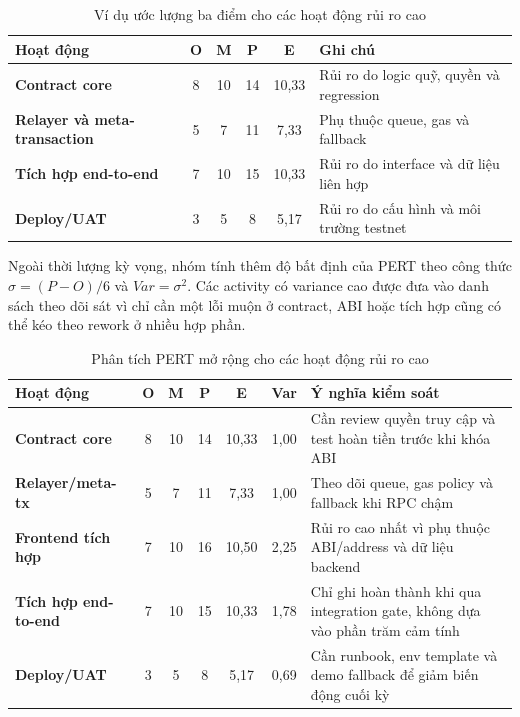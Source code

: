 \begin{table}[H]
\centering
\caption{Ví dụ ước lượng ba điểm cho các hoạt động rủi ro cao}
\label{tab:three-point-estimation}
\begin{tabularx}{\textwidth}{| >{\bfseries}p{4.2cm} | c | c | c | c | X |}
\hline
Hoạt động & O & M & P & E & Ghi chú \\
\hline
Contract core & 8 & 10 & 14 & 10,33 & Rủi ro do logic quỹ, quyền và regression \\ \hline
Relayer và meta-transaction & 5 & 7 & 11 & 7,33 & Phụ thuộc queue, gas và fallback \\ \hline
Tích hợp end-to-end & 7 & 10 & 15 & 10,33 & Rủi ro do interface và dữ liệu liên hợp \\ \hline
Deploy/UAT & 3 & 5 & 8 & 5,17 & Rủi ro do cấu hình và môi trường testnet \\
\hline
\end{tabularx}
\end{table}

Ngoài thời lượng kỳ vọng, nhóm tính thêm độ bất định của PERT theo công thức $\sigma=(P-O)/6$ và $Var=\sigma^2$. Các activity có variance cao được đưa vào danh sách theo dõi sát vì chỉ cần một lỗi muộn ở contract, ABI hoặc tích hợp cũng có thể kéo theo rework ở nhiều hợp phần.

\begin{table}[H]
\centering
\caption{Phân tích PERT mở rộng cho các hoạt động rủi ro cao}
\label{tab:pert-variance}
\begin{tabularx}{\textwidth}{| >{\bfseries}p{3.2cm} | c | c | c | c | c | X |}
\hline
Hoạt động & O & M & P & E & Var & Ý nghĩa kiểm soát \\
\hline
Contract core & 8 & 10 & 14 & 10,33 & 1,00 & Cần review quyền truy cập và test hoàn tiền trước khi khóa ABI \\ \hline
Relayer/meta-tx & 5 & 7 & 11 & 7,33 & 1,00 & Theo dõi queue, gas policy và fallback khi RPC chậm \\ \hline
Frontend tích hợp & 7 & 10 & 16 & 10,50 & 2,25 & Rủi ro cao nhất vì phụ thuộc ABI/address và dữ liệu backend \\ \hline
Tích hợp end-to-end & 7 & 10 & 15 & 10,33 & 1,78 & Chỉ ghi hoàn thành khi qua integration gate, không dựa vào phần trăm cảm tính \\ \hline
Deploy/UAT & 3 & 5 & 8 & 5,17 & 0,69 & Cần runbook, env template và demo fallback để giảm biến động cuối kỳ \\
\hline
\end{tabularx}
\end{table}

